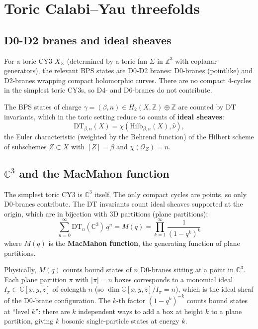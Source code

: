 \documentclass[11pt]{article}
\theoremstyle{definition}
\newcommand{\Hilb}{\mathrm{Hilb}}
\newcommand{\DT}{\mathrm{DT}}
\newcommand{\cO}{\mathcal{O}}
\newcommand{\bZ}{\mathbb{Z}}
\newcommand{\bC}{\mathbb{C}}
\begin{document}
\section{Toric Calabi--Yau threefolds}
\label{sec:toric}

\subsection{D0-D2 branes and ideal sheaves}

For a toric CY3 $X_\Sigma$ (determined by a toric fan $\Sigma$ in
$\bZ^3$ with coplanar generators), the relevant BPS states are D0-D2
branes: D0-branes (pointlike) and D2-branes wrapping compact
holomorphic curves. There are no compact 4-cycles in the simplest
toric CY3s, so D4- and D6-branes do not contribute.

The BPS states of charge $\gamma = (\beta, n) \in H_2(X,\bZ) \oplus
\bZ$ are counted by DT invariants, which in the toric setting reduce
to counts of \textbf{ideal sheaves}:
\[
 \DT_{\beta, n}(X) = \chi(\Hilb_{\beta, n}(X), \hat{\nu}),
\]
the Euler characteristic (weighted by the Behrend function) of the
Hilbert scheme of subschemes $Z \subset X$ with $[Z] = \beta$ and
$\chi(\cO_Z) = n$.

\subsection{$\bC^3$ and the MacMahon function}

The simplest toric CY3 is $\bC^3$ itself. The only compact cycles
are points, so only D0-branes contribute. The DT invariants count
ideal sheaves supported at the origin, which are in bijection with
3D partitions (plane partitions):
\[
 \sum_{n=0}^\infty \DT_n(\bC^3) \, q^n
 = M(q) = \prod_{k=1}^\infty \frac{1}{(1-q^k)^k}
\]
where $M(q)$ is the \textbf{MacMahon function}, the generating
function of plane partitions.

Physically, $M(q)$ counts bound states of $n$ D0-branes sitting at a
point in $\bC^3$. Each plane partition $\pi$ with $|\pi| = n$ boxes
corresponds to a monomial ideal $I_\pi \subset \bC[x,y,z]$ of
colength $n$ (so $\dim \bC[x,y,z]/I_\pi = n$), which is the ideal
sheaf of the D0-brane configuration. The $k$-th factor
$(1-q^k)^{-k}$ counts bound states at ``level $k$'': there are $k$
independent ways to add a box at height $k$ to a plane partition,
giving $k$ bosonic single-particle states at energy $k$.
\end{document}
